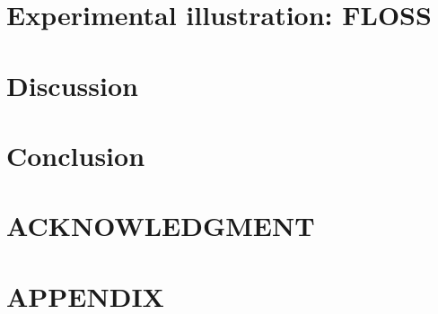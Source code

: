 \documentclass{misqdoc} %
\begin{document}
\section{Experimental illustration: FLOSS}\label{sec:results}


\section{Discussion}\label{sec:discussion}


\section{Conclusion}\label{sec:conclusion}



\section*{ACKNOWLEDGMENT}%





%
\section*{APPENDIX}\label{sec:appendix}


%
%


\theendnotes





\end{document}
